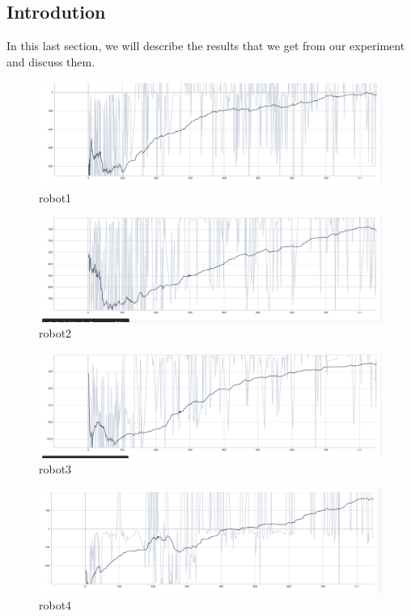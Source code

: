 \documentclass[12pt]{extarticle}
\begin{document}
\pagebreak

\subsection{Introdution}

In this last section, we will describe the results that we get from our experiment and discuss them.



\begin{figure}[h]  

\includegraphics[scale=0.40]{robot1}
\caption[robot1]{robot1}
\end{figure}

\begin{figure}[h]  

\includegraphics[scale=0.40]{robot2}
\caption[robot2]{robot2}
\end{figure}

\begin{figure}[h]  

\includegraphics[scale=0.40]{robot3}
\caption[robot3]{robot3}
\end{figure}

\begin{figure}[h]  

\includegraphics[scale=0.40]{robot4}
\caption[robot4]{robot4}
\end{figure}

 


\newpage


\end{document}

